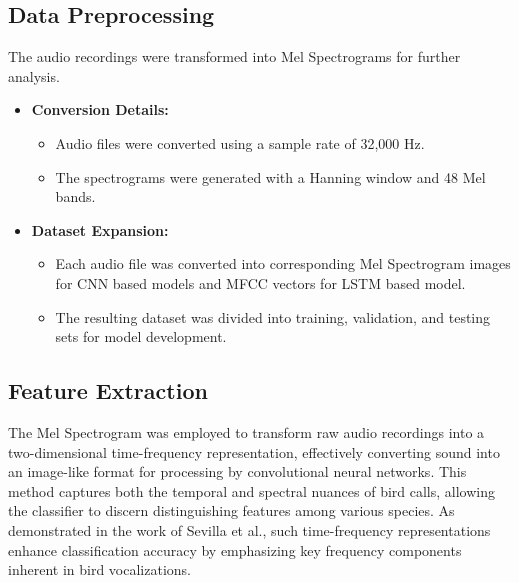         

        \subsection{Data Preprocessing}
        The audio recordings were transformed into Mel Spectrograms for further
        analysis.

        \begin{itemize}
            \item \textbf{Conversion Details:}
                \begin{itemize}
                    \item Audio files were converted using a sample rate of 32,000 Hz.
                    \item The spectrograms were generated with a Hanning window and 48 Mel bands.
                \end{itemize}

            \item \textbf{Dataset Expansion:}
                \begin{itemize}
                    \item Each audio file was converted into corresponding Mel
                            Spectrogram images for CNN based models and MFCC vectors for LSTM based model.
                    \item The resulting dataset was divided into training, validation, and testing sets
                            for model development.
                \end{itemize}
        \end{itemize} 

      \subsection{Feature Extraction}
      The Mel Spectrogram was employed to transform raw audio recordings into a two-dimensional time-frequency representation, effectively converting sound into an image-like format for processing by convolutional neural networks. This method captures both the temporal and spectral nuances of bird calls, allowing the classifier to discern distinguishing features among various species. As demonstrated in the work of Sevilla et al.\cite{sevilla2017audio}, such time-frequency representations enhance classification accuracy by emphasizing key frequency components inherent in bird vocalizations.

